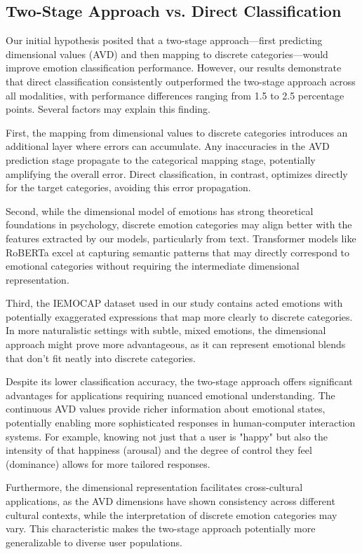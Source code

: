 \documentclass[12pt]{article}
\begin{document}
\subsection{Two-Stage Approach vs. Direct Classification}

Our initial hypothesis posited that a two-stage approach—first predicting dimensional values (AVD) and then mapping to discrete categories—would improve emotion classification performance. However, our results demonstrate that direct classification consistently outperformed the two-stage approach across all modalities, with performance differences ranging from 1.5 to 2.5 percentage points. Several factors may explain this finding.

First, the mapping from dimensional values to discrete categories introduces an additional layer where errors can accumulate. Any inaccuracies in the AVD prediction stage propagate to the categorical mapping stage, potentially amplifying the overall error. Direct classification, in contrast, optimizes directly for the target categories, avoiding this error propagation.

Second, while the dimensional model of emotions has strong theoretical foundations in psychology, discrete emotion categories may align better with the features extracted by our models, particularly from text. Transformer models like RoBERTa excel at capturing semantic patterns that may directly correspond to emotional categories without requiring the intermediate dimensional representation.

Third, the IEMOCAP dataset used in our study contains acted emotions with potentially exaggerated expressions that map more clearly to discrete categories. In more naturalistic settings with subtle, mixed emotions, the dimensional approach might prove more advantageous, as it can represent emotional blends that don't fit neatly into discrete categories.

Despite its lower classification accuracy, the two-stage approach offers significant advantages for applications requiring nuanced emotional understanding. The continuous AVD values provide richer information about emotional states, potentially enabling more sophisticated responses in human-computer interaction systems. For example, knowing not just that a user is "happy" but also the intensity of that happiness (arousal) and the degree of control they feel (dominance) allows for more tailored responses.

Furthermore, the dimensional representation facilitates cross-cultural applications, as the AVD dimensions have shown consistency across different cultural contexts, while the interpretation of discrete emotion categories may vary. This characteristic makes the two-stage approach potentially more generalizable to diverse user populations.
\end{document}
